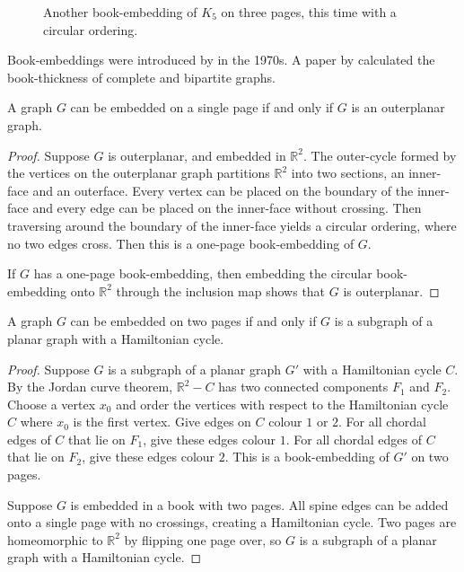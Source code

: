 \begin{figure}[h!]
	\centering
	
	\caption[Three-page circular book-embedding of $K_5$]{Another book-embedding of $K_5$ on three pages, this time with a circular ordering.}\label{fig:circular_book-embedding}
\end{figure}

Book-embeddings were introduced by \textcite{kainenRecentResultsTopological1974, ollmannBookThicknessVarious1973} in the 1970s. A paper by \textcite{bernhartBookThicknessGraph1979} calculated the book-thickness of complete and bipartite graphs.
\begin{proposition}\label{lem:Pagenumber_1}
	A graph \(G\) can be embedded on a single page if and only if \(G\) is an outerplanar graph.
\end{proposition}
\begin{proof}
	Suppose $G$ is outerplanar, and embedded in $\mathbb{R}^2$. The outer-cycle formed by the vertices on the outerplanar graph partitions $\mathbb{R}^2$ into two sections, an inner-face and an outerface. Every vertex can be placed on the boundary of the inner-face and every edge can be placed on the inner-face without crossing. Then traversing around the boundary of the inner-face yields a circular ordering, where no two edges cross. Then this is a one-page book-embedding of $G$. 

	If $G$ has a one-page book-embedding, then embedding the circular book-embedding onto $\mathbb{R}^2$ through the inclusion map shows that $G$ is outerplanar. 
\end{proof}
\begin{proposition}\label{lem:Pagenumber_2}
	A graph \(G\) can be embedded on two pages if and only if \(G\) is a subgraph of a planar graph with a Hamiltonian cycle.
\end{proposition}

\begin{proof}
	Suppose $G$ is a subgraph of a planar graph $G'$ with a Hamiltonian cycle $C$. By the Jordan curve theorem, $\mathbb{R}^2 - C$ has two connected components $F_1$ and $F_2$. Choose a vertex $x_0$ and order the vertices with respect to the Hamiltonian cycle $C$ where $x_0$ is the first vertex. Give edges on $C$ colour $1$ or $2$. For all chordal edges of $C$ that lie on $F_1$, give these edges colour $1$. For all chordal edges of $C$ that lie on $F_2$, give these edges colour $2$. This is a book-embedding of $G'$ on two pages. 

	Suppose $G$ is embedded in a book with two pages. All spine edges can be added onto a single page with no crossings, creating a Hamiltonian cycle. Two pages are homeomorphic to $\mathbb{R}^2$ by flipping one page over, so $G$ is a subgraph of a planar graph with a Hamiltonian cycle. 
\end{proof}
